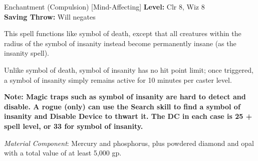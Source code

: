 {Enchantment (Compulsion) [Mind-Affecting]}
{
	\textbf{Level:}
	Clr 8, Wiz 8\\
	\textbf{Saving Throw:}
	Will negates\\
}
{
	This spell functions like symbol of death, except that all creatures within the radius of the symbol of insanity instead become permanently insane (as the insanity spell).

	Unlike symbol of death, symbol of insanity has no hit point limit; once triggered, a symbol of insanity simply remains active for 10 minutes per caster level.

	\textbf{Note: Magic traps such as symbol of insanity are hard to detect and disable. A rogue (only) can use the Search skill to find a symbol of insanity and Disable Device to thwart it. The DC in each case is 25 + spell level, or 33 for symbol of insanity.}

	\textit{Material Component}:
	Mercury and phosphorus, plus powdered diamond and opal with a total value of at least 5,000 gp.

}
